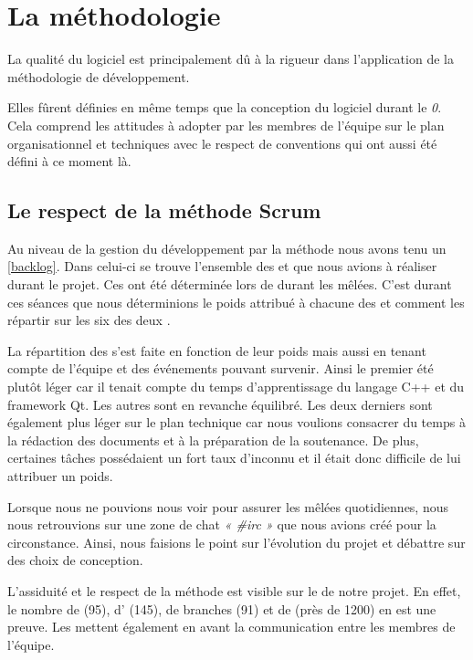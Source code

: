 \section{La méthodologie}
La qualité du logiciel \FactDev{} est principalement dû à la rigueur dans l'application de la méthodologie de développement. 

Elles fûrent définies en même temps que la conception du logiciel durant le \Sprint{} \textit{0}. Cela comprend les attitudes à adopter par les membres de l'équipe sur le plan organisationnel et techniques avec le respect de conventions qui ont aussi été défini à ce moment là.
 
\subsection{Le respect de la méthode Scrum}
Au niveau de la gestion du développement par la méthode \Scrum{} nous avons tenu un \Backlog{} \ref{backlog}. Dans celui-ci se trouve l'ensemble des \UserStories{} et\TechnicalStories{} que nous avions à réaliser durant le projet. Ces \Stories{} ont été déterminée lors de \PlanningPoker durant les mêlées. C'est durant ces séances que nous déterminions le poids attribué à chacune des \Stories{} et comment les répartir sur les six \Sprints{} des deux \Releases.  

La répartition des \Stories{} s'est faite en fonction de leur poids mais aussi en tenant compte de l'équipe et des événements pouvant survenir. Ainsi le premier \Sprint{} été plutôt léger car il tenait compte du temps d'apprentissage du langage C++ et du framework Qt. Les autres \Sprints{} sont en revanche équilibré. Les deux derniers sont également plus léger sur le plan technique car nous voulions consacrer du temps à la rédaction des documents et à la préparation de la soutenance. De plus, certaines tâches possédaient un fort taux d'inconnu et il était donc difficile de lui attribuer un poids. 
  
Lorsque nous ne pouvions nous voir pour assurer les mêlées quotidiennes, nous nous retrouvions sur une zone  de chat \textit{« \#irc »} que nous avions créé pour la circonstance. Ainsi, nous faisions le point sur l'évolution du projet et débattre sur des choix de conception.

L'assiduité et le respect de la méthode \Scrum{} est visible sur le \Github{} de notre projet. En effet, le nombre de \PullRequest{} (95), d'\Issues{} (145), de branches (91) et de \Commits{} (près de 1200) en est une preuve. Les \PullRequest{} mettent également en avant la communication entre les membres de l'équipe.

